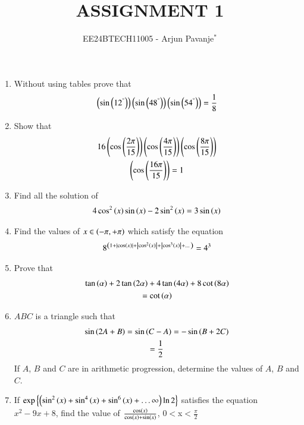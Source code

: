 \documentclass[journal,12pt,article,twocolumn]{IEEEtran}
\theoremstyle{remark}
\begin{document}

\vspace{3cm}

\title{ASSIGNMENT 1}
\author{EE24BTECH11005 - Arjun Pavanje$^{*}$%
}
\maketitle
\newpage
\bigskip
\begin{enumerate}
\item Without using tables prove that 
\begin{align*} 
\left(\sin\left(12^{\degree}\right)\right)\left(\sin\left(48^{\degree}\right)\right)\left(\sin\left(54^{\degree}\right)\right)= \frac{1}{8}
\end{align*}
\hfill {}
\item Show that 
\begin{multline*}
16\left(\cos\left(\frac{2\pi}{15}\right)\right)\left(\cos\left(\frac{4\pi}{15}\right)\right)\left(\cos\left(\frac{8\pi}{15}\right)\right)\\\left(\cos\left(\frac{16\pi}{15}\right)\right)=1
\end{multline*}
\hfill{}
\item Find all the solution of 
\begin{align*}
4\cos^2\left(x\right) \sin \left(x\right) -2\sin^2\left(x\right) = 3\sin \left(x\right)
\end{align*}
\hfill{}
\item Find the values of $x \in \brak{-\pi, +\pi}$ which satisfy the equation
\begin{align*}
8^{\left(1+\left\vert\cos \left(x\right)\right\vert+\left\vert\cos^2\left(x\right)\right\vert+\left\vert\cos^3\left(x\right)\right\vert+\dots\right)}= 4^3
\end{align*}
\hfill{}
\item Prove that 
\begin{multline*}
\tan \left(\alpha\right)+2\tan \left(2\alpha\right)+4\tan \left(4\alpha\right)+8\cot \left(8\alpha\right)\\=\cot \left(\alpha\right)
\end{multline*}
\hfill{}
\item $ABC$ is a triangle such that 
\begin{multline*}
\sin{\ensuremath{\left(2A+B\right)}}=\sin{\ensuremath{\left(C-A\right)}}=-\sin{\ensuremath{\left(B+2C\right)}}\\=\frac{1}{2}
\end{multline*}
If $A$, $B$ and $C$ are in arithmetic progression, determine the values of $A$, $B$ and $C$.
\hfill{}
\item If $\exp \cbrak{\brak{\sin^2\brak{x}+\sin^4\brak{x}+\sin^6\brak{x}+\dots\infty}\ln 2}$ satisfies the equation $x^2-9x+8$, find the value of $\frac{\cos \brak{x}}{\cos \brak{x} + \sin \brak{x}}$, 0$<$x$<$$\frac{\pi}{2}$
$$
\end{enumerate}
\end{document}
